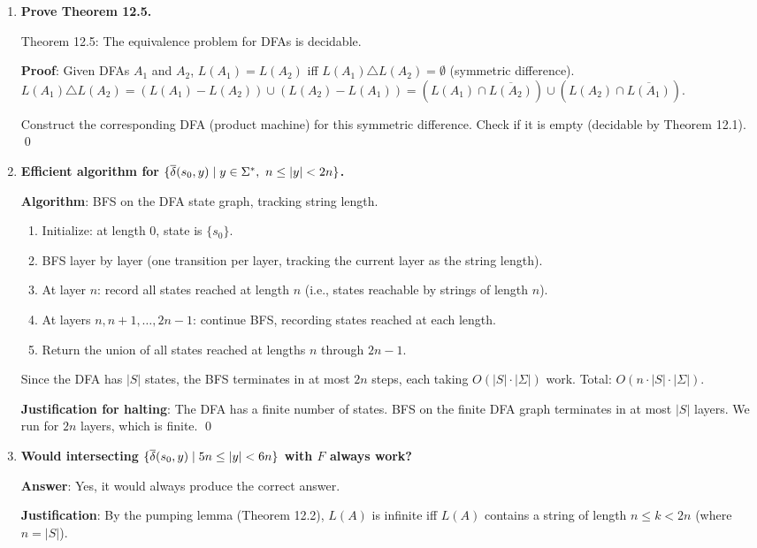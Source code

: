 \begin{enumerate}[{12.}1. ]
\item \textbf{Prove Theorem 12.5.}

Theorem 12.5: The equivalence problem for DFAs is decidable.

\textbf{Proof}: Given DFAs $A_1$ and $A_2$, $L(A_1)=L(A_2)$ iff $L(A_1)\triangle L(A_2)=\emptyset$ (symmetric difference).
$L(A_1)\triangle L(A_2) = (L(A_1)-L(A_2))\cup(L(A_2)-L(A_1)) = (L(A_1)\cap\overline{L(A_2)})\cup(L(A_2)\cap\overline{L(A_1)})$.

Construct the corresponding DFA (product machine) for this symmetric difference. Check if it is empty (decidable by Theorem 12.1). \qed

\item \textbf{Efficient algorithm for $\{\DBAR(s_0,y)\mid y\in\Sigma^*,\ n\leq|y|<2n\}$.}

\textbf{Algorithm}: BFS on the DFA state graph, tracking string length.
\begin{enumerate}
\item Initialize: at length 0, state is $\{s_0\}$.
\item BFS layer by layer (one transition per layer, tracking the current layer as the string length).
\item At layer $n$: record all states reached at length $n$ (i.e., states reachable by strings of length $n$).
\item At layers $n, n+1, \ldots, 2n-1$: continue BFS, recording states reached at each length.
\item Return the union of all states reached at lengths $n$ through $2n-1$.
\end{enumerate}
Since the DFA has $|S|$ states, the BFS terminates in at most $2n$ steps, each taking $O(|S|\cdot|\Sigma|)$ work. Total: $O(n\cdot|S|\cdot|\Sigma|)$.

\textbf{Justification for halting}: The DFA has a finite number of states. BFS on the finite DFA graph terminates in at most $|S|$ layers. We run for $2n$ layers, which is finite. \qed

\item \textbf{Would intersecting $\{\overline{\delta}(s_0,y)\mid 5n\leq|y|<6n\}$ with $F$ always work?}

\textbf{Answer}: Yes, it would always produce the correct answer.

\textbf{Justification}: By the pumping lemma (Theorem 12.2), $L(A)$ is infinite iff $L(A)$ contains a string of length $n \leq k < 2n$ (where $n=|S|$).


\end{enumerate}
